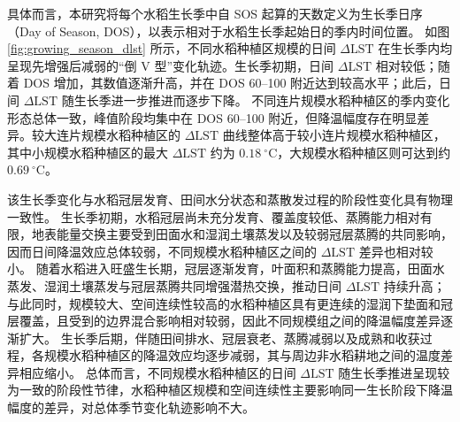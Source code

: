 具体而言，本研究将每个水稻生长季中自 SOS 起算的天数定义为生长季日序（Day of Season, DOS），以表示相对于水稻生长季起始日的季内时间位置。
如图 \ref{fig:growing_season_dlst} 所示，不同水稻种植区规模的日间 $\Delta \mathrm{LST}$ 在生长季内均呈现先增强后减弱的“倒 V 型”变化轨迹。生长季初期，日间 $\Delta \mathrm{LST}$ 相对较低；随着 DOS 增加，其数值逐渐升高，并在 DOS 60--100 附近达到较高水平；此后，日间 $\Delta \mathrm{LST}$ 随生长季进一步推进而逐步下降。
不同连片规模水稻种植区的季内变化形态总体一致，峰值阶段均集中在 DOS 60--100 附近，但降温幅度存在明显差异。较大连片规模水稻种植区的 $\Delta \mathrm{LST}$ 曲线整体高于较小连片规模水稻种植区，其中小规模水稻种植区的最大 $\Delta \mathrm{LST}$ 约为 $0.18~^{\circ}\mathrm{C}$，大规模水稻种植区则可达到约 $0.69~^{\circ}\mathrm{C}$。%

该生长季变化与水稻冠层发育、田间水分状态和蒸散发过程的阶段性变化具有物理一致性。
生长季初期，水稻冠层尚未充分发育、覆盖度较低、蒸腾能力相对有限，地表能量交换主要受到田面水和湿润土壤蒸发以及较弱冠层蒸腾的共同影响，因而日间降温效应总体较弱，不同规模水稻种植区之间的 $\Delta \mathrm{LST}$ 差异也相对较小。
随着水稻进入旺盛生长期，冠层逐渐发育，叶面积和蒸腾能力提高，田面水蒸发、湿润土壤蒸发与冠层蒸腾共同增强潜热交换，推动日间 $\Delta \mathrm{LST}$ 持续升高；与此同时，规模较大、空间连续性较高的水稻种植区具有更连续的湿润下垫面和冠层覆盖，且受到的边界混合影响相对较弱，因此不同规模组之间的降温幅度差异逐渐扩大。
生长季后期，伴随田间排水、冠层衰老、蒸腾减弱以及成熟和收获过程，各规模水稻种植区的降温效应均逐步减弱，其与周边非水稻耕地之间的温度差异相应缩小。
总体而言，不同规模水稻种植区的日间 $\Delta \mathrm{LST}$ 随生长季推进呈现较为一致的阶段性节律，水稻种植区规模和空间连续性主要影响同一生长阶段下降温幅度的差异，对总体季节变化轨迹影响不大。


